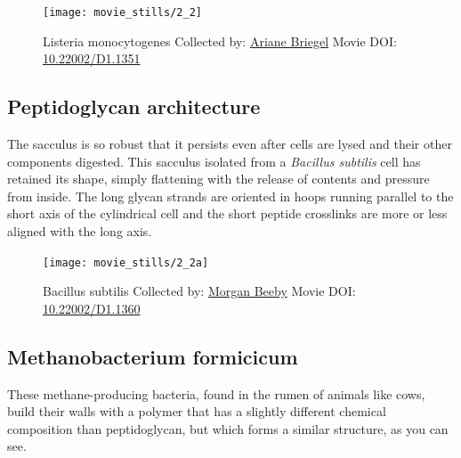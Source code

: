 \documentclass[]{tufte-book}
\begin{document}
\begin{figure}
\texttt{[image: movie\_stills/2\_2]} \caption[Listeria monocytogenes Collected by:
\protect\hyperlink{ariane_briegel}{Ariane Briegel} Movie DOI:
\href{https://doi.org/10.22002/D1.1351}{10.22002/D1.1351}]{Listeria monocytogenes Collected by:
\protect\hyperlink{ariane_briegel}{Ariane Briegel} Movie DOI:
\href{https://doi.org/10.22002/D1.1351}{10.22002/D1.1351}}\label{fig:2-2}
\end{figure}

\hypertarget{Peptidoglycan_architecture}{\subsection{Peptidoglycan
architecture}\label{Peptidoglycan_architecture}}

The sacculus is so robust that it persists even after cells are lysed
and their other components digested. This sacculus isolated from a
\emph{Bacillus subtilis} cell has retained its shape, simply flattening
with the release of contents and pressure from inside. The long glycan
strands are oriented in hoops running parallel to the short axis of the
cylindrical cell and the short peptide crosslinks are more or less
aligned with the long axis.





\begin{figure}
\texttt{[image: movie\_stills/2\_2a]} \caption[Bacillus subtilis Collected by:
\protect\hyperlink{morgan_beeby}{Morgan Beeby} Movie DOI:
\href{https://doi.org/10.22002/D1.1360}{10.22002/D1.1360}]{Bacillus subtilis Collected by:
\protect\hyperlink{morgan_beeby}{Morgan Beeby} Movie DOI:
\href{https://doi.org/10.22002/D1.1360}{10.22002/D1.1360}}\label{fig:2-2a}
\end{figure}

\hypertarget{Methanobacterium_formicicum}{\subsection{Methanobacterium
formicicum}\label{Methanobacterium_formicicum}}

These methane-producing bacteria, found in the rumen of animals like
cows, build their walls with a polymer that has a slightly different
chemical composition than peptidoglycan, but which forms a similar
structure, as you can see.
\end{document}
